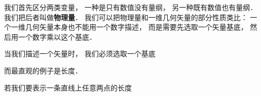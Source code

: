 

我们首先区分两类变量， 一种是只有数值没有量纲， 另一种既有数值也有量纲． 我们把后者叫做\textbf{物理量}． 我们可以把物理量和一维几何矢量的部分性质类比： 一个一维几何矢量本身也不能用一个数字描述， 而是需要先选取一个矢量基底， 然后用一个数字乘以这个基底．

当我们描述一个矢量时， 我们必须选取一个基底

而最直观的例子是长度．

若我们要表示一条直线上任意两点的长度
